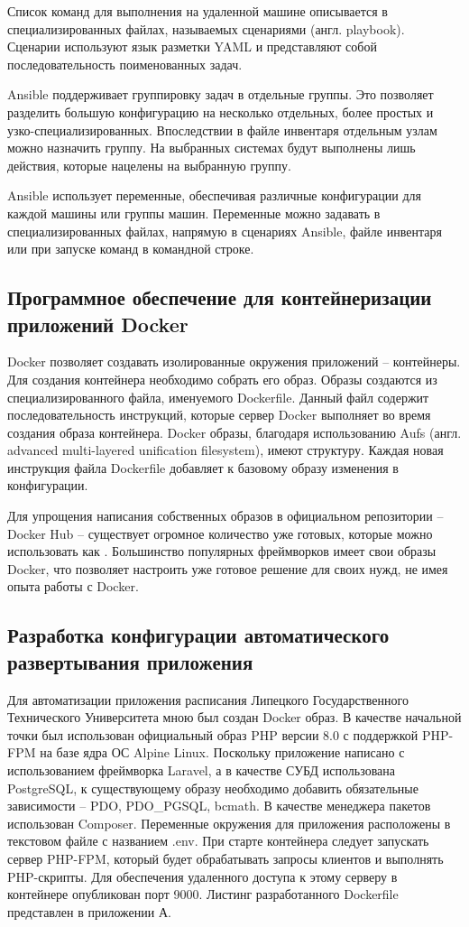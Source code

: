 Список команд для выполнения на удаленной машине описывается в
специализированных файлах, называемых сценариями (англ. playbook). Сценарии
используют язык разметки YAML и представляют собой последовательность
поименованных задач.

Ansible поддерживает группировку задач в отдельные группы.
Это позволяет разделить большую конфигурацию на несколько отдельных, более
простых и узко-специализированных. Впоследствии в файле инвентаря отдельным
узлам можно назначить группу. На выбранных системах будут выполнены лишь
действия, которые нацелены на выбранную группу.

Ansible использует переменные, обеспечивая различные конфигурации для каждой
машины или группы машин. Переменные можно задавать в специализированных файлах,
напрямую в сценариях Ansible, файле инвентаря или при запуске команд в командной
строке.


\subsection{Программное обеспечение для контейнеризации приложений Docker}
Docker позволяет создавать изолированные окружения приложений -- контейнеры. Для
создания контейнера необходимо собрать его образ. Образы создаются из
специализированного файла, именуемого Dockerfile. Данный файл содержит
последовательность инструкций, которые сервер Docker выполняет во время создания
образа контейнера. Docker образы, благодаря использованию Aufs (англ. advanced
multi-layered unification filesystem), имеют  структуру.
Каждая новая инструкция файла Dockerfile добавляет к базовому образу изменения в
конфигурации.

Для упрощения написания собственных образов в официальном репозитории -- Docker
Hub -- существует огромное количество уже готовых, которые можно
использовать как . Большинство популярных
фреймворков имеет свои образы Docker, что позволяет настроить уже готовое
решение для своих нужд, не имея опыта работы с Docker.

\subsection{Разработка конфигурации автоматического развертывания приложения}
Для автоматизации приложения расписания Липецкого Государственного Технического
Университета мною был создан Docker образ. В качестве начальной точки был
использован официальный образ PHP версии 8.0 с поддержкой PHP-FPM на базе ядра
ОС Alpine Linux. Поскольку приложение написано с использованием фреймворка
Laravel, а в качестве СУБД использована PostgreSQL, к существующему образу
необходимо добавить обязательные зависимости -- PDO, PDO\_PGSQL, bcmath. В
качестве менеджера пакетов использован Composer. Переменные окружения для
приложения расположены в текстовом файле с названием .env. При старте контейнера
следует запускать сервер PHP-FPM, который будет обрабатывать запросы клиентов и
выполнять PHP-скрипты. Для обеспечения удаленного доступа к этому серверу в
контейнере опубликован порт 9000. Листинг разработанного Dockerfile представлен
в приложении А.

